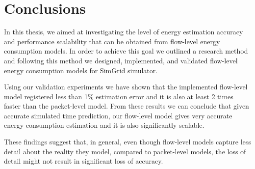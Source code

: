 \chapter{Conclusions}
\label{chapter:conclusions}

In this thesis, we aimed at investigating the level of energy estimation accuracy and performance scalability that can be obtained from flow-level energy consumption models. In order to achieve this goal we outlined a research method and following this method we designed, implemented, and validated flow-level energy consumption models for SimGrid simulator. 

Using our validation experiments we have shown that the implemented flow-level model registered less than 1\% estimation error and it is also at least 2 times faster than the packet-level model. From these results we can conclude that given accurate simulated time prediction, our flow-level model gives very accurate energy consumption estimation and it is also significantly scalable. 

These findings suggest that, in general, even though flow-level models capture less detail about the reality they model, compared to packet-level models, the loss of detail might not result in significant loss of accuracy. 

